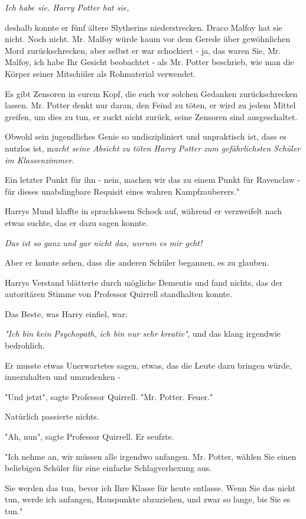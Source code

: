 {\emph{Ich habe sie. Harry Potter hat sie,}

deshalb konnte er fünf ältere Slytherins niederstrecken. Draco Malfoy hat sie nicht. Noch nicht. Mr. Malfoy würde kaum vor dem Gerede über gewöhnlichen Mord zurückschrecken, aber selbst er war schockiert - ja, das waren Sie, Mr. Malfoy, ich habe Ihr Gesicht beobachtet - als Mr. Potter beschrieb, wie man die Körper seiner Mitschüler als Rohmaterial verwendet.

Es gibt Zensoren in eurem Kopf, die euch vor solchen Gedanken zurückschrecken lassen. Mr. Potter denkt nur daran, den Feind zu töten, er wird zu jedem Mittel greifen, um dies zu tun, er zuckt nicht zurück, seine Zensoren sind ausgeschaltet.

Obwohl sein jugendliches Genie so undiszipliniert und unpraktisch ist, dass es nutzlos ist, m\emph{acht seine Absicht zu töten Harry Potter zum gefährlichsten Schüler im Klassenzimmer.}

Ein letzter Punkt für ihn - nein, machen wir das zu einem Punkt für Ravenclaw - für dieses unabdingbare Requisit eines wahren Kampfzauberers."

Harrys Mund klaffte in sprachlosem Schock auf, während er verzweifelt nach etwas suchte, das er dazu sagen konnte.

\emph{Das ist so ganz und gar nicht das, worum es mir geht!}

Aber er konnte sehen, dass die anderen Schüler begannen, es zu glauben.

Harrys Verstand blätterte durch mögliche Dementis und fand nichts, das der autoritären Stimme von Professor Quirrell standhalten konnte.

Das Beste, was Harry einfiel, war:

\emph{"Ich bin kein Psychopath, ich bin nur sehr kreativ"}, und das klang irgendwie bedrohlich.

Er musste etwas Unerwartetes sagen, etwas, das die Leute dazu bringen würde, innezuhalten und umzudenken -

"Und jetzt", sagte Professor Quirrell. "Mr. Potter. Feuer."

Natürlich passierte nichts.

"Ah, nun", sagte Professor Quirrell. Er seufzte.

"Ich nehme an, wir müssen alle irgendwo anfangen. Mr. Potter, wählen Sie einen beliebigen Schüler für eine einfache Schlagverhexung aus.

Sie werden das tun, bevor ich Ihre Klasse für heute entlasse. Wenn Sie das nicht tun, werde ich anfangen, Hauspunkte abzuziehen, und zwar so lange, bis Sie es tun."

}

